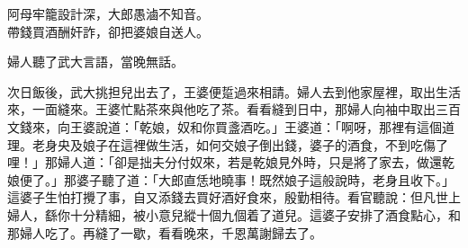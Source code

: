 \begin{myquote} 
阿母牢籠設計深，大郎愚滷不知音。\\帶錢買酒酬奸詐，卻把婆娘自送人。{}
\end{myquote} 

婦人聽了武大言語，當晚無話。

次日飯後，武大挑担兒出去了，王婆便踅過來相請。婦人去到他家屋裡，取出生活來，一面縫來。王婆忙點茶來與他吃了茶。看看縫到日中，那婦人向袖中取出三百文錢來，向王婆說道：「乾娘，奴和你買盞酒吃。」王婆道：「啊呀，那裡有這個道理。老身央及娘子在這裡做生活，如何交娘子倒出錢，婆子的酒食，不到吃傷了哩！」{}那婦人道：「卻是拙夫分付奴來，若是乾娘見外時，只是將了家去，做還乾娘便了。」那婆子聽了道：「大郎直恁地曉事！既然娘子這般說時，老身且收下。」這婆子生怕打攪了事，自又添錢去買好酒好食來，殷勤相待。看官聽說：但凡世上婦人，繇你十分精細，被小意兒縱十個九個着了道兒。這婆子安排了酒食點心，和那婦人吃了。再縫了一歇，看看晚來，千恩萬謝歸去了。

